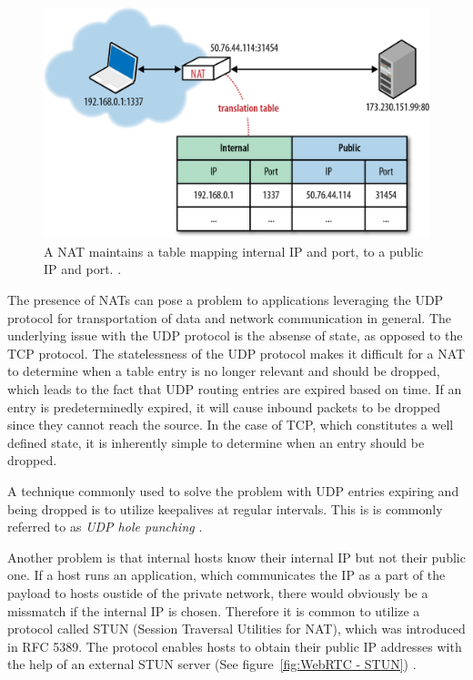 \begin{figure}[htp]
\centering
\includegraphics[width=\textwidth,height=0.2\paperheight,keepaspectratio
]{figures/nat}
\caption{A NAT maintains a table mapping internal IP and port, to a public IP and port. \cite{NATIllustration:Online}.}
\label{fig:NAT}
\end{figure}

The presence of NATs can pose a problem to applications leveraging the UDP protocol for transportation of data and network communication in general. The underlying issue with the UDP protocol is the absense of state, as opposed to the TCP protocol. The statelessness of the UDP protocol makes it difficult for a NAT to determine when a table entry is no longer relevant and should be dropped, which leads to the fact that UDP routing entries are expired based on time. If an entry is predeterminedly expired, it will cause inbound packets to be dropped since they cannot reach the source. In the case of TCP, which constitutes a well defined state, it is inherently simple to determine when an entry should be dropped.

A technique commonly used to solve the problem with UDP entries expiring and being dropped is to utilize keepalives at regular intervals. This is is commonly referred to as \emph{UDP hole punching} \cite{UDPHolePunching:Online}.

Another problem is that internal hosts know their internal IP but not their public one. If a host runs an application, which communicates the IP as a part of the payload to hosts oustide of the private network, there would obviously be a missmatch if the internal IP is chosen. Therefore it is common to utilize a protocol called STUN (Session Traversal Utilities for NAT), which was introduced in RFC 5389. The protocol enables hosts to obtain their public IP addresses with the help of an external STUN server (See figure~\ref{fig:WebRTC - STUN}) \cite{RFC5389:Online}.

